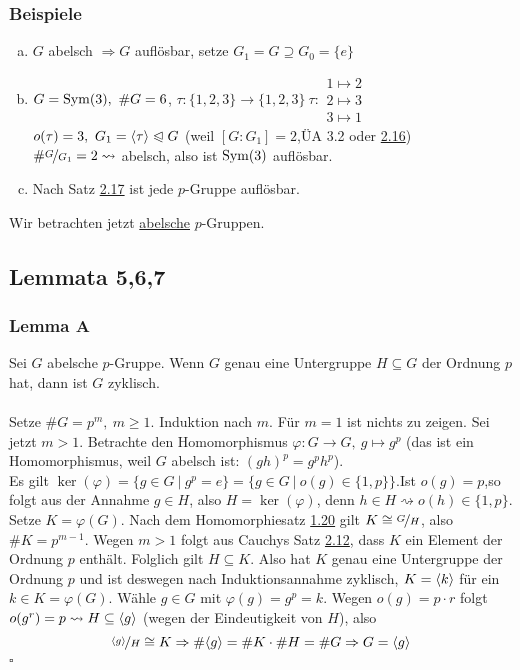\subsubsection*{Beispiele}
\begin{enumerate}[(a)]
	\item $G$ abelsch $\Rightarrow G$ auflösbar, setze $G_1=G\supseteq G_0=\{e\}$
	\item $G=\operatorname{Sym}(3),~\#G=6$, $\tau:\{1,2,3\}\to \{1,2,3\}~\tau:\begin{array}{c} 1\mapsto 2\\ 2\mapsto 3\\ 3\mapsto 1    \end{array}$\\
	$o(\tau)=3,~G_1=\langle \tau \rangle\trianglelefteqslant G$ (weil $[G:G_1]=2$,ÜA 3.2 oder \hyperref[sub:satz_8]{2.16})\\
	$\#\nicefrac{G}{G_1}=2\rightsquigarrow$ abelsch, also ist $\operatorname{Sym}(3)$ auflösbar.
	\item Nach Satz \hyperref[sub:lemma_4]{2.17} ist jede $p$-Gruppe auflösbar.
\end{enumerate}

Wir betrachten jetzt \uline{abelsche} $p$-Gruppen.

\subsection{Lemmata 5,6,7}
\label{sub:lemmata}
\subsubsection*{Lemma A}
Sei $G$ abelsche $p$-Gruppe. Wenn $G$ genau eine Untergruppe $H\subseteq G$ der Ordnung $p$ hat, dann ist $G$ zyklisch.\\

\\
Setze $\#G=p^m,~m\ge 1$. Induktion nach $m$. Für $m=1$ ist nichts zu zeigen. Sei jetzt $m>1$. Betrachte den Homomorphismus $\varphi: G\to G,~g\mapsto g^p$ (das ist ein Homomorphismus, weil $G$ abelsch ist: $(gh)^p=g^ph^p$).\\
Es gilt $\ker(\varphi)=\big\{g\in G~|~g^p=e \big\}=\big\{g\in G~|~o(g)\in \{1,p\} \big\}$.Ist $o(g)=p$,so folgt aus der Annahme $g\in H$, also $H=\ker(\varphi)$, denn $h\in H\rightsquigarrow o(h)\in \{1,p\}$.\\
Setze $K=\varphi(G)$. Nach dem Homomorphiesatz \hyperref[sub:der_homomorphiesatz]{1.20} gilt $K\cong \nicefrac{G}{H}$, also $\#K=p^{m-1}$. Wegen $m>1$ folgt aus Cauchys Satz \hyperref[sub:cauchys_satz]{2.12}, dass $K$ ein Element der Ordnung $p$ enthält. Folglich gilt $H\subseteq K$. Also hat $K$ genau eine Untergruppe der Ordnung $p$ und ist deswegen nach Induktionsannahme zyklisch, $K=\langle k \rangle$ für ein $k\in K=\varphi(G)$. Wähle $g\in G$ mit $\varphi(g)=g^p=k$. Wegen $o(g)=p\cdot r$ folgt $o(g^r)=p\rightsquigarrow H\subseteq \langle g \rangle$ (wegen der Eindeutigkeit von $H$), also \[\nicefrac{\langle g \rangle}{H}\cong K\Rightarrow\#\langle g \rangle=\#K\cdot\#H=\#G\Rightarrow G=\langle g \rangle\]
\hfill $\square$

